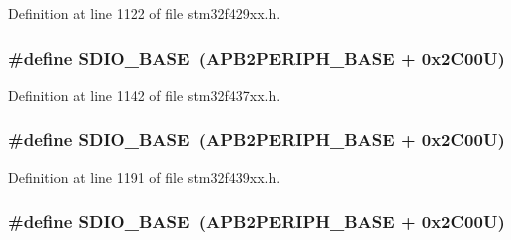 Definition at line 1122 of file stm32f429xx.\+h.

\subsubsection[{\texorpdfstring{S\+D\+I\+O\+\_\+\+B\+A\+SE}{SDIO_BASE}}]{\setlength{\rightskip}{0pt plus 5cm}\#define S\+D\+I\+O\+\_\+\+B\+A\+SE~({\bf A\+P\+B2\+P\+E\+R\+I\+P\+H\+\_\+\+B\+A\+SE} + 0x2\+C00\+U)}\hypertarget{group___peripheral__memory__map_ga95dd0abbc6767893b4b02935fa846f52}{}\label{group___peripheral__memory__map_ga95dd0abbc6767893b4b02935fa846f52}


Definition at line 1142 of file stm32f437xx.\+h.

\subsubsection[{\texorpdfstring{S\+D\+I\+O\+\_\+\+B\+A\+SE}{SDIO_BASE}}]{\setlength{\rightskip}{0pt plus 5cm}\#define S\+D\+I\+O\+\_\+\+B\+A\+SE~({\bf A\+P\+B2\+P\+E\+R\+I\+P\+H\+\_\+\+B\+A\+SE} + 0x2\+C00\+U)}\hypertarget{group___peripheral__memory__map_ga95dd0abbc6767893b4b02935fa846f52}{}\label{group___peripheral__memory__map_ga95dd0abbc6767893b4b02935fa846f52}


Definition at line 1191 of file stm32f439xx.\+h.

\subsubsection[{\texorpdfstring{S\+D\+I\+O\+\_\+\+B\+A\+SE}{SDIO_BASE}}]{\setlength{\rightskip}{0pt plus 5cm}\#define S\+D\+I\+O\+\_\+\+B\+A\+SE~({\bf A\+P\+B2\+P\+E\+R\+I\+P\+H\+\_\+\+B\+A\+SE} + 0x2\+C00\+U)}\hypertarget{group___peripheral__memory__map_ga95dd0abbc6767893b4b02935fa846f52}{}\label{group___peripheral__memory__map_ga95dd0abbc6767893b4b02935fa846f52}


